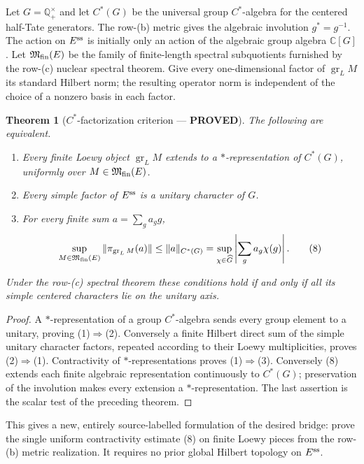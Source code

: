 \documentclass[11pt]{article}
\newcommand{\PROVED}{\textcolor{green!40!black}{\textbf{PROVED}}}
\newtheorem{theorem}{Theorem}
\begin{document}
Let $G=\mathbb Q_+^\times$ and let $C^*(G)$ be the universal group
$C^*$-algebra for the centered half-Tate generators.  The row-(b) metric
gives the algebraic involution $g^*=g^{-1}$.  The action on $E^{\rm ss}$
is initially only an action of the algebraic group algebra $\mathbb C[G]$.
Let $\mathfrak M_{\rm fin}(E)$ be the family of finite-length spectral
subquotients furnished by the row-(c) nuclear spectral theorem.  Give every
one-dimensional factor of $\operatorname{gr}_L M$ its standard Hilbert
norm; the resulting operator norm is independent of the choice of a
nonzero basis in each factor.

\begin{theorem}[$C^*$-factorization criterion --- \PROVED]
The following are equivalent.
\begin{enumerate}
\item Every finite Loewy object $\operatorname{gr}_L M$ extends to a
      $*$-representation of $C^*(G)$, uniformly over
      $M\in\mathfrak M_{\rm fin}(E)$.
\item Every simple factor of $E^{\rm ss}$ is a unitary character of $G$.
\item For every finite sum $a=\sum_g a_g g$,
\begin{equation}
 \sup_{M\in\mathfrak M_{\rm fin}(E)}
 \|\pi_{\operatorname{gr}_L M}(a)\|
 \le \|a\|_{C^*(G)}
 =\sup_{\chi\in\widehat G}\left|\sum_g a_g\chi(g)\right|.      \tag{8}
\end{equation}
\end{enumerate}
Under the row-(c) spectral theorem these conditions hold if and only if all
its simple centered characters lie on the unitary axis.
\end{theorem}

\begin{proof}
A $*$-representation of a group $C^*$-algebra sends every group element to
a unitary, proving (1)$\Rightarrow$(2).  Conversely a finite Hilbert direct
sum of the simple unitary character factors, repeated according to their
Loewy multiplicities, proves (2)$\Rightarrow$(1).  Contractivity of
$*$-representations proves (1)$\Rightarrow$(3).  Conversely (8) extends
each finite algebraic representation continuously to $C^*(G)$;
preservation of the involution makes every extension a
$*$-representation.  The last assertion is the scalar test of the
preceding theorem.
\end{proof}

This gives a new, entirely source-labelled formulation of the desired
bridge: prove the single uniform contractivity estimate (8) on finite
Loewy pieces from the row-(b) metric realization.  It requires no prior
global Hilbert topology on $E^{\rm ss}$.
\end{document}
